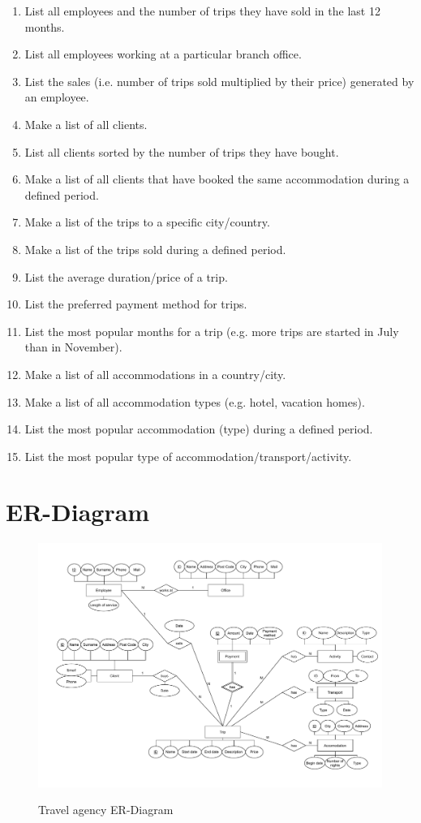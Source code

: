 \documentclass{article}
\begin{document}
			\begin{enumerate}
				\item List all employees and the number of trips they have sold in the last 12 months.
				\item List all employees working at a particular branch office.
				\item List the sales (i.e. number of trips sold multiplied by their price) generated by an employee. 
				\item Make a list of all clients.
				\item List all clients sorted by the number of trips they have bought.
				\item Make a list of all clients that have booked the same accommodation 	during a defined period.
				\item Make a list of the trips to a specific city/country. 
				\item Make a list of the trips sold during a defined period.
				\item List the average duration/price of a trip.
				\item List the preferred payment method for trips.
				\item List the most popular months for a trip (e.g. more trips are started in July than in November).
				\item Make a list of all accommodations in a country/city. 
				\item Make a list of all accommodation types (e.g. hotel, vacation homes).
				\item List the most popular accommodation (type) during a defined period.
				\item List the most popular type of accommodation/transport/activity.
			\end{enumerate}	

	\newpage
	
	\section*{ER-Diagram}
	\begin{figure}[htbp]
		\centering
			\includegraphics[width=1.15\textwidth, angle=90]{../Proposition 2.pdf}
		\label{ER-Model}
		\caption{Travel agency ER-Diagram}
	\end{figure}
	
\end{document}
